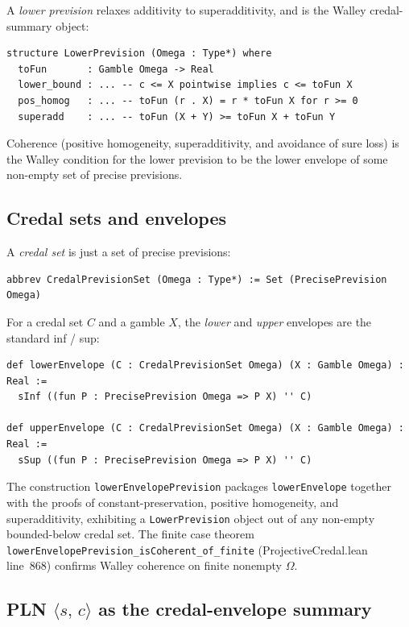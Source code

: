 \documentclass[]{article}
\newcommand{\lid}[1]{{\ttfamily\nolinkurl{#1}}}
\newcommand{\STV}[2]{\langle #1,\, #2 \rangle}
\begin{document}
A \emph{lower prevision} relaxes additivity to superadditivity, and is
the Walley credal-summary object:
\begin{lstlisting}
structure LowerPrevision (Omega : Type*) where
  toFun       : Gamble Omega -> Real
  lower_bound : ... -- c <= X pointwise implies c <= toFun X
  pos_homog   : ... -- toFun (r . X) = r * toFun X for r >= 0
  superadd    : ... -- toFun (X + Y) >= toFun X + toFun Y
\end{lstlisting}
Coherence (positive homogeneity, superadditivity, and avoidance of sure
loss) is the Walley condition for the lower prevision to be the
lower envelope of some non-empty set of precise previsions.

\subsection{Credal sets and envelopes}

A \emph{credal set} is just a set of precise previsions:
\begin{lstlisting}
abbrev CredalPrevisionSet (Omega : Type*) := Set (PrecisePrevision Omega)
\end{lstlisting}

For a credal set $C$ and a gamble $X$, the \emph{lower} and \emph{upper}
envelopes are the standard inf / sup:
\begin{lstlisting}
def lowerEnvelope (C : CredalPrevisionSet Omega) (X : Gamble Omega) : Real :=
  sInf ((fun P : PrecisePrevision Omega => P X) '' C)

def upperEnvelope (C : CredalPrevisionSet Omega) (X : Gamble Omega) : Real :=
  sSup ((fun P : PrecisePrevision Omega => P X) '' C)
\end{lstlisting}
The construction
\lid{lowerEnvelopePrevision} packages \lid{lowerEnvelope} together with
the proofs of constant-preservation, positive homogeneity, and
superadditivity, exhibiting a \lid{LowerPrevision} object out of any
non-empty bounded-below credal set. The finite case theorem
\lid{lowerEnvelopePrevision\_isCoherent\_of\_finite}
(ProjectiveCredal.lean line~868) confirms Walley coherence on finite
nonempty $\Omega$.

\subsection{PLN $\STV{s}{c}$ as the credal-envelope summary}\label{sec:stv-summary}
\end{document}
